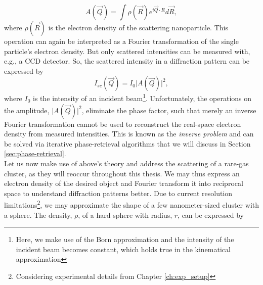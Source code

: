 \begin{equation}
A(\vec{Q})=\int \rho\left(\vec{R}\right) e^{i \vec{Q}\cdot R}d\vec{R},
\label{eq:scattered-amplitude}
\end{equation}
where $\rho\left(\vec{R}\right)$ is the electron density of the scattering nanoparticle. This operation can again be interpreted as a Fourier transformation of the single particle’s electron density. But only scattered intensities can be measured with, e.g., a CCD detector. So, the scattered intensity in a diffraction pattern can be expressed by
\begin{equation}
I_{sc}\left(\vec{Q}\right)=I_{0}\lvert A(\vec{Q})\rvert^{2},
\label{eq:scattered-intensity}
\end{equation}
where $I_{0}$ is the intensity of an incident beam\footnote{Here, we make use of the Born approximation and the intensity of the incident beam becomes constant, which holds true in the kinematical approximation}. Unfortunately, the operations on the amplitude, $\lvert A(\vec{Q})\rvert^{2}$, eliminate the phase factor, such that merely an inverse Fourier transformation cannot be used to reconstruct the real-space electron density from measured intensities. This is known as the \textit{inverse problem} and can be solved via iterative phase-retrieval algorithms that we will discuss in Section \ref{sec:phase-retrieval}.\\[1\baselineskip]
%
Let us now make use of above's theory and address the scattering of a rare-gas cluster, as they will reoccur throughout this thesis. We may thus express an electron density of the desired object and Fourier transform it into reciprocal space to understand diffraction patterns better. Due to current resolution limitations\footnote{Considering experimental details from Chapter \ref{ch:exp_setup}}, we may approximate the shape of a few nanometer-sized cluster with a sphere. The density, $\rho$, of a hard sphere with radius, $r$, can be expressed by 
